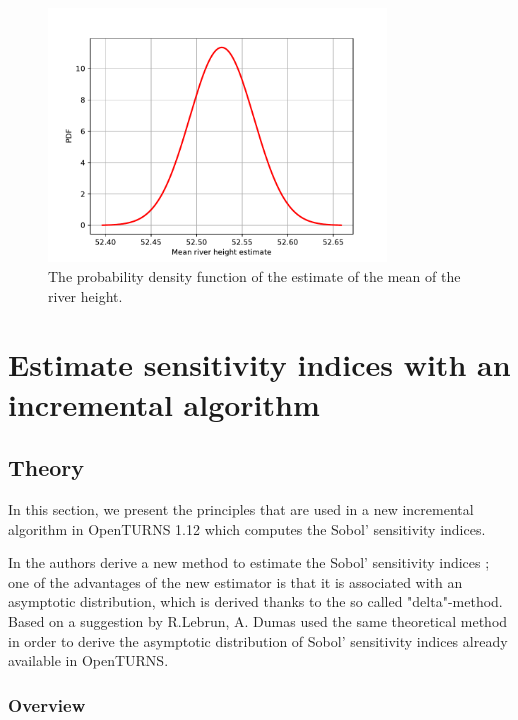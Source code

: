 \documentclass{article}
\begin{document}
\begin{figure}
\centering
\includegraphics[width=0.8\textwidth]{figures/MeanSDistribution.pdf}
\caption{The probability density function of the estimate 
of the mean of the river height.}
\label{fig-variableMeanS}
\end{figure}


\section{Estimate sensitivity indices with an incremental algorithm}

\subsection{Theory}

In this section, we present the principles that are used in a new incremental 
algorithm in OpenTURNS 1.12 which computes the Sobol' sensitivity indices. 

In \cite{Janon2014} the authors derive a new method to estimate the 
Sobol' sensitivity indices ; one of the advantages of the new 
estimator is that it is associated with an asymptotic distribution, 
which is derived thanks to the so called "delta"-method. 
Based on a suggestion by R.Lebrun, A. Dumas \cite{RapportSobol2018} 
used the same theoretical method in order to derive the 
asymptotic distribution of Sobol' sensitivity indices already available 
in OpenTURNS. 


\subsubsection{Overview}
\end{document}
